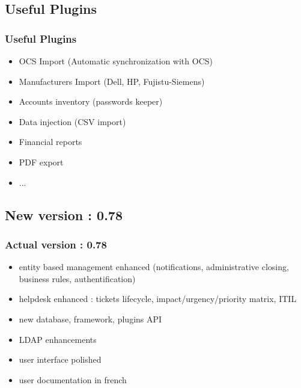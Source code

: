\documentclass{beamer}
\begin{document}
\subsection{Useful Plugins}
\begin{frame}
\frametitle{Useful Plugins}
%
\begin{itemize}
%
\item OCS Import (Automatic synchronization with OCS)
\item Manufacturers Import (Dell, HP, Fujistu-Siemens)
\item Accounts inventory (passwords keeper)
\item Data injection (CSV import)
\item Financial reports
\item PDF export
\item ...
%
\end{itemize}
\end{frame}
%

\subsection{New version : 0.78}
%
\begin{frame}
\frametitle{Actual version : 0.78}
%
\begin{itemize}
%
\item entity based management enhanced (notifications, administrative closing, business rules, authentification)
\item helpdesk enhanced : tickets lifecycle, impact/urgency/priority matrix, ITIL
\item new database, framework, plugins API
\item LDAP enhancements
\item user interface polished
\item user documentation in french
%
\end{itemize}
\end{frame}
%
%
%
%
\end{document}
